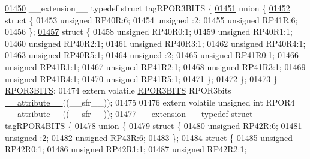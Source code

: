 \begin{DoxyCode}
\hypertarget{a00009_source_l01450}{}\hyperlink{a00008}{01450} \_\_extension\_\_ \textcolor{keyword}{typedef} \textcolor{keyword}{struct }tagRPOR3BITS \{
\hypertarget{a00009_source_l01451}{}\hyperlink{a00009}{01451}   \textcolor{keyword}{union }\{
\hypertarget{a00009_source_l01452}{}\hyperlink{a00009}{01452}     \textcolor{keyword}{struct }\{
01453       \textcolor{keywordtype}{unsigned} RP40R:6;
01454       \textcolor{keywordtype}{unsigned} :2;
01455       \textcolor{keywordtype}{unsigned} RP41R:6;
01456     \};
\hypertarget{a00009_source_l01457}{}\hyperlink{a00009}{01457}     \textcolor{keyword}{struct }\{
01458       \textcolor{keywordtype}{unsigned} RP40R0:1;
01459       \textcolor{keywordtype}{unsigned} RP40R1:1;
01460       \textcolor{keywordtype}{unsigned} RP40R2:1;
01461       \textcolor{keywordtype}{unsigned} RP40R3:1;
01462       \textcolor{keywordtype}{unsigned} RP40R4:1;
01463       \textcolor{keywordtype}{unsigned} RP40R5:1;
01464       \textcolor{keywordtype}{unsigned} :2;
01465       \textcolor{keywordtype}{unsigned} RP41R0:1;
01466       \textcolor{keywordtype}{unsigned} RP41R1:1;
01467       \textcolor{keywordtype}{unsigned} RP41R2:1;
01468       \textcolor{keywordtype}{unsigned} RP41R3:1;
01469       \textcolor{keywordtype}{unsigned} RP41R4:1;
01470       \textcolor{keywordtype}{unsigned} RP41R5:1;
01471     \};
01472   \};
01473 \} \hyperlink{a00008_de/d3d/a00748}{RPOR3BITS};
01474 \textcolor{keyword}{extern} \textcolor{keyword}{volatile} \hyperlink{a00008_de/d3d/a00748}{RPOR3BITS} RPOR3bits \hyperlink{a00009_a493c46f03454991ccc5aa7a6e1dfb2a7}{\_\_attribute\_\_}((\_\_sfr\_\_));
01475 
01476 \textcolor{keyword}{extern} \textcolor{keyword}{volatile} \textcolor{keywordtype}{unsigned} \textcolor{keywordtype}{int}  RPOR4 \hyperlink{a00009_a493c46f03454991ccc5aa7a6e1dfb2a7}{\_\_attribute\_\_}((\_\_sfr\_\_));
\hypertarget{a00009_source_l01477}{}\hyperlink{a00008}{01477} \_\_extension\_\_ \textcolor{keyword}{typedef} \textcolor{keyword}{struct }tagRPOR4BITS \{
\hypertarget{a00009_source_l01478}{}\hyperlink{a00009}{01478}   \textcolor{keyword}{union }\{
\hypertarget{a00009_source_l01479}{}\hyperlink{a00009}{01479}     \textcolor{keyword}{struct }\{
01480       \textcolor{keywordtype}{unsigned} RP42R:6;
01481       \textcolor{keywordtype}{unsigned} :2;
01482       \textcolor{keywordtype}{unsigned} RP43R:6;
01483     \};
\hypertarget{a00009_source_l01484}{}\hyperlink{a00009}{01484}     \textcolor{keyword}{struct }\{
01485       \textcolor{keywordtype}{unsigned} RP42R0:1;
01486       \textcolor{keywordtype}{unsigned} RP42R1:1;
01487       \textcolor{keywordtype}{unsigned} RP42R2:1;

\end{DoxyCode}
